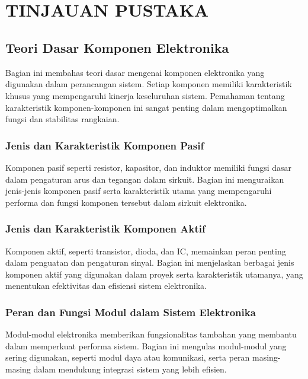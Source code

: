 
\chapter[TINJAUAN PUSTAKA]{\\ TINJAUAN PUSTAKA}

\section{Teori Dasar Komponen Elektronika}
Bagian ini membahas teori dasar mengenai komponen elektronika yang digunakan dalam perancangan sistem. Setiap komponen memiliki karakteristik khusus yang mempengaruhi kinerja keseluruhan sistem. Pemahaman tentang karakteristik komponen-komponen ini sangat penting dalam mengoptimalkan fungsi dan stabilitas rangkaian.

\subsection{Jenis dan Karakteristik Komponen Pasif}
Komponen pasif seperti resistor, kapasitor, dan induktor memiliki fungsi dasar dalam pengaturan arus dan tegangan dalam sirkuit. Bagian ini menguraikan jenis-jenis komponen pasif serta karakteristik utama yang mempengaruhi performa dan fungsi komponen tersebut dalam sirkuit elektronika.

\subsection{Jenis dan Karakteristik Komponen Aktif}
Komponen aktif, seperti transistor, dioda, dan IC, memainkan peran penting dalam penguatan dan pengaturan sinyal. Bagian ini menjelaskan berbagai jenis komponen aktif yang digunakan dalam proyek serta karakteristik utamanya, yang menentukan efektivitas dan efisiensi sistem elektronika.

\subsection{Peran dan Fungsi Modul dalam Sistem Elektronika}
Modul-modul elektronika memberikan fungsionalitas tambahan yang membantu dalam memperkuat performa sistem. Bagian ini mengulas modul-modul yang sering digunakan, seperti modul daya atau komunikasi, serta peran masing-masing dalam mendukung integrasi sistem yang lebih efisien.

